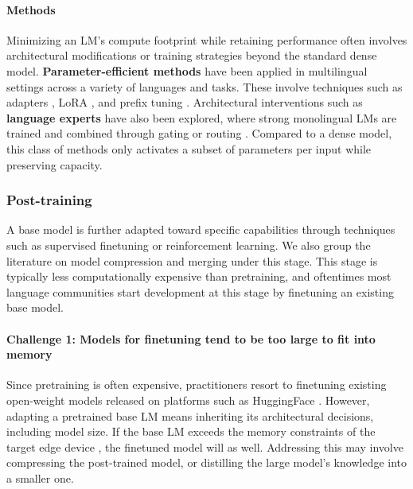\documentclass[11pt,a4paper]{article}
\begin{document}
\paragraph{Methods}
Minimizing an LM's compute footprint while retaining performance often involves architectural modifications or training strategies beyond the standard dense model.
\textbf{Parameter-efficient methods} have been applied in multilingual settings across a variety of languages and tasks.
These involve techniques such as adapters \citep{houlsby-etal-2019-parameter,pfeiffer-etal-2020-mad,pfeiffer-etal-2021-unks,pfeiffer-etal-2022-lifting,parovic-etal-2023-cross}, LoRA \citep{hu2022lora,whitehouse-etal-2024-low,dong-etal-2025-mlas,owodunni2025continuallyaddingnewlanguages}, and prefix tuning \citep{li-liang-2021-prefix,zhan-etal-2024-prefix}.
Architectural interventions such as \textbf{language experts} have also been explored, where strong monolingual LMs are trained and combined through gating \citep{blevins-etal-2024-breaking,li-etal-2025-group} or routing \citep{zhao2024sparse,bandarkar2026multilingualroutingmixtureofexperts}.
Compared to a dense model, this class of methods only activates a subset of parameters per input while preserving capacity.


\subsubsection{Post-training}
\label{sec:post_training}

A base model is further adapted toward specific capabilities through techniques such as supervised finetuning \citep[SFT,][]{ouyang2022traininglanguagemodelsfollow} or reinforcement learning.
We also group the literature on model compression and merging under this stage.
This stage is typically less computationally expensive than pretraining, and oftentimes most language communities start development at this stage by finetuning an existing base model.

\paragraph{Challenge 1: Models for finetuning \iconalignment{} tend to be too large to fit into memory \iconmemory{}}
Since pretraining is often expensive, practitioners resort to finetuning existing open-weight models released on platforms such as HuggingFace \citep{davidson2023aicapabilitiessignificantlyimproved,wolfe-etal-2024-laboratory}.
However, adapting a pretrained base LM means inheriting its architectural decisions, including model size.
If the base LM exceeds the memory constraints of the target edge device \citep{zheng2025reviewedgeLLM}, the finetuned model will as well.
Addressing this may involve compressing the post-trained model, or distilling the large model's knowledge into a smaller one.
\end{document}
